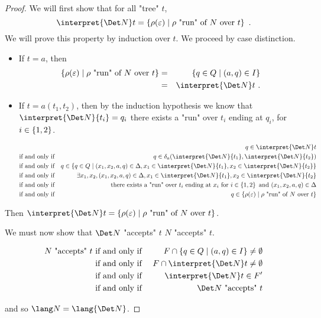 \documentclass{article}
\begin{document}
\begin{proof}
	We will first show that for all "tree" $t$,
	\[
		\interpret {\Det N} t = \setdef {\rho(\varepsilon)}{\text{$\rho$ "run" of~$N$ over~$t$}}\ .
	\]
	We will prove this property by induction over $t$. We proceed by case distinction.
	\begin{itemize}
		\item If $t = a$, then
		      \begin{eqnarray*}
			      \setdef {\rho(\varepsilon)}{\text{$\rho$ "run" of~$N$ over~$t$}} &=&  \setdef {q \in Q} {(a,q) \in I} \\
			      &=& \interpret {\Det N} t\ .
		      \end{eqnarray*}
		\item If $t = a(t_1,t_2)$, then
		      by the induction hypothesis we know that
		      $\interpret {\Det N} {t_i} = q_i$ \tiff there exists a "run" over $t_i$ ending at $q_i$, for $i \in \left\{1,2\right\}$.

		      \begin{eqnarray*}
			      &&q \in \interpret {\Det N} t \\
			      &\text{if and only if}& q \in \delta_a (\interpret {\Det N} {t_1}, \interpret {\Det N} {t_2}) \\
			      &\text{if and only if}& q \in \setdef {q \in  Q} {(x_1,x_2,a,q) \in \Delta, x_1 \in \interpret {\Det N} {t_1}, x_2 \in \interpret {\Det N} {t_2}} \\
			      &\text{if and only if}& \exists x_1,x_2, (x_1,x_2,a,q) \in \Delta, x_1 \in \interpret {\Det N} {t_1}, x_2 \in \interpret {\Det N} {t_2} \\
			      &\text{if and only if}& \text{there exists a "run" over }  t_i  \text { ending at } x_i \text { for  } i \in \set {1,2} \text{ and } (x_1,x_2,a,q) \in \Delta\\
			      &\text{if and only if}& q \in \setdef {\rho(\varepsilon)}{\text{$\rho$ "run" of~$N$ over~$t$}}
		      \end{eqnarray*}
	\end{itemize}
	Then $ \interpret {\Det N} t = \setdef {\rho(\varepsilon)}{\text{$\rho$ "run" of~$N$ over~$t$}}$.

	We must now show that $\Det N$ "accepts" $t$ \tiff $N$ "accepts" $t$.

	\begin{eqnarray*}
		N \text{ "accepts" } t &\tiff& F \cap \setdef {q \in Q} {(a,q) \in I} \neq \emptyset \\
		&\tiff&   F \cap  \interpret {\Det N} t \neq \emptyset \\
		&\tiff& \interpret {\Det N} t  \in F' \\
		&\tiff& {\Det N} \text{ "accepts" } t
	\end{eqnarray*}

	and so $\lang N = \lang {\Det N}$.

\end{proof}
\end{document}

